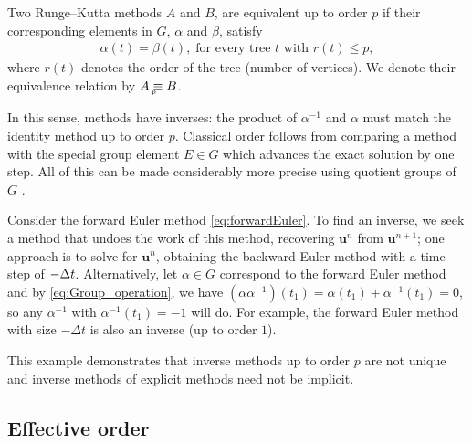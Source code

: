 \begin{definition}\label{def:Equivalent_methods}
	Two Runge--Kutta methods $A$ and $B$, are equivalent up to order 
	$p$ if their corresponding elements in $G$, $\alpha$ and $\beta$, satisfy
	\begin{align*}
		\alpha(t) = \beta(t), \; \text{for every tree $t$ with $r(t) \leq p$},
	\end{align*}
	where $r(t)$ denotes the order of the tree (number of vertices).
	We denote their equivalence relation by $A \underaccent{p}{\equiv} B$. 
\end{definition}

In this sense, methods have inverses: the product of $\alpha^{-1}$ and
$\alpha$ must match the identity method up to order $p$.
Classical order follows from comparing a method with the special group
element $E \in G$ which advances the exact solution by one step.
All of this can be made considerably more precise using quotient
groups of $G$ \cite{Butcher2008_book}.


\begin{example}\label{ex:FE_inv_2}
  Consider the forward Euler method \eqref{eq:forwardEuler}.
  To find an inverse, we seek a method that undoes the work of this method,
  recovering $\bm{u}^{n}$ from $\bm{u}^{n+1}$;
  one approach is to solve for $\bm{u}^{n}$, obtaining the backward Euler method
  with a time-step of $-\Delta t$.
  Alternatively, let $\alpha \in G$ correspond to the forward Euler method and by
  \eqref{eq:Group_operation}, we have
  $(\alpha\alpha^{-1})(t_1) = \alpha(t_1) + \alpha^{-1}(t_1) = 0$,
  so any $\alpha^{-1}$ with $\alpha^{-1}(t_1) = -1$ will do.
  For example, the forward Euler method with size $-\Delta t$ is also an
  inverse (up to order $1$).
\end{example}
This example demonstrates that inverse methods up to order $p$ are not
unique and inverse methods of explicit methods need not be implicit.


\subsection{Effective order}\label{sec:Effective_order}

